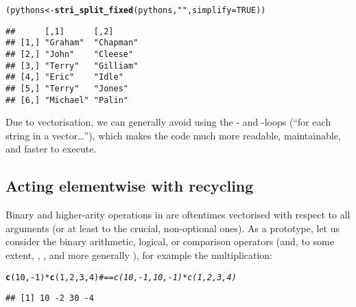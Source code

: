 \documentclass[nojss]{jss}\usepackage[]{graphicx}\usepackage[]{xcolor}
\makeatletter
\newcommand{\hlnum}[1]{\textcolor[rgb]{0.686,0.059,0.569}{#1}}%
\newcommand{\hlstr}[1]{\textcolor[rgb]{0.192,0.494,0.8}{#1}}%
\newcommand{\hlcom}[1]{\textcolor[rgb]{0.678,0.584,0.686}{\textit{#1}}}%
\newcommand{\hlopt}[1]{\textcolor[rgb]{0,0,0}{#1}}%
\newcommand{\hlstd}[1]{\textcolor[rgb]{0.345,0.345,0.345}{#1}}%
\newcommand{\hlkwb}[1]{\textcolor[rgb]{0.69,0.353,0.396}{#1}}%
\newcommand{\hlkwc}[1]{\textcolor[rgb]{0.333,0.667,0.333}{#1}}%
\newcommand{\hlkwd}[1]{\textcolor[rgb]{0.737,0.353,0.396}{\textbf{#1}}}%
\newenvironment{kframe}{%
 \def\at@end@of@kframe{}%
 \ifinner\ifhmode%
  \def\at@end@of@kframe{\end{minipage}}%
  \begin{minipage}{\columnwidth}%
 \fi\fi%
 \def\FrameCommand##1{\hskip\@totalleftmargin \hskip-\fboxsep
 \colorbox{shadecolor}{##1}\hskip-\fboxsep
     \hskip-\linewidth \hskip-\@totalleftmargin \hskip\columnwidth}%
 \MakeFramed {\advance\hsize-\width
   \@totalleftmargin\z@ \linewidth\hsize
   \@setminipage}}%
 {\par\unskip\endMakeFramed%
 \at@end@of@kframe}
\newenvironment{knitrout}{}{} %
\makeatother
\begin{document}
\begin{knitrout}
\color{fgcolor}\begin{kframe}
\begin{alltt}
\hlstd{(pythons} \hlkwb{<-} \hlkwd{stri_split_fixed}\hlstd{(pythons,} \hlstr{" "}\hlstd{,} \hlkwc{simplify}\hlstd{=}\hlnum{TRUE}\hlstd{))}
\end{alltt}
\begin{verbatim}
##      [,1]      [,2]     
## [1,] "Graham"  "Chapman"
## [2,] "John"    "Cleese" 
## [3,] "Terry"   "Gilliam"
## [4,] "Eric"    "Idle"   
## [5,] "Terry"   "Jones"  
## [6,] "Michael" "Palin"
\end{verbatim}
\end{kframe}
\end{knitrout}

\noindent
Due to {vectorisation}, we can generally
avoid using the - and -loops
(``for each string in a vector\dots''),
which makes the code much more readable, maintainable, and faster to execute.





\subsection{Acting elementwise with recycling}



Binary and higher-arity operations in 
are oftentimes vectorised with respect to all arguments
(or at least to the crucial, non-optional ones).
As a prototype, let us consider the binary arithmetic,
logical, or comparison operators
(and, to some extent, ,
, and more generally ),
for example the multiplication:



\begin{knitrout}
\color{fgcolor}\begin{kframe}
\begin{alltt}
\hlkwd{c}\hlstd{(}\hlnum{10}\hlstd{,} \hlopt{-}\hlnum{1}\hlstd{)} \hlopt{*} \hlkwd{c}\hlstd{(}\hlnum{1}\hlstd{,} \hlnum{2}\hlstd{,} \hlnum{3}\hlstd{,} \hlnum{4}\hlstd{)}  \hlcom{# == c(10, -1, 10, -1) * c(1, 2, 3, 4)}
\end{alltt}
\begin{verbatim}
## [1] 10 -2 30 -4
\end{verbatim}
\end{kframe}
\end{knitrout}
\end{document}
